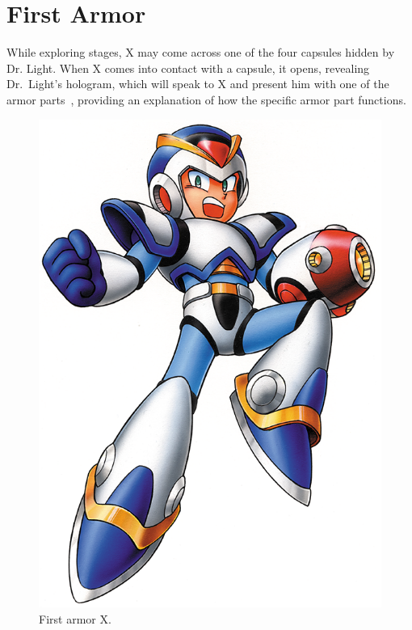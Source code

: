 \section{First Armor}\label{X1:Armor}

While exploring stages, X may come across one of the four capsules hidden by Dr. Light. When X comes into contact with a capsule, it opens, revealing Dr.~Light's hologram, which will speak to X and present him with one of the armor parts~\cite{wiki:First_armor}, providing an explanation of how the specific armor part functions. 
\begin{figure}[htp]
	\centering
	\includegraphics[width=0.2\linewidth]{figures/X1/First_armor.png}
	\caption{First armor X.}
\end{figure}

